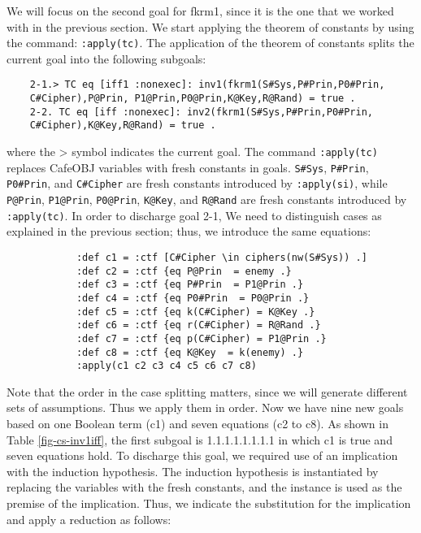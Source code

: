 \documentclass[a4paper,fleqn]{cas-dc}
\begin{document}
We will focus on the second goal for fkrm1, since it is the one that we worked with in the previous section. We start applying the theorem of constants by using the command: \verb!:apply(tc)!. The application of the theorem of constants splits the current goal into the following subgoals:
\begin{small}
	\begin{verbatim}
	2-1.> TC eq [iff1 :nonexec]: inv1(fkrm1(S#Sys,P#Prin,P0#Prin,
	C#Cipher),P@Prin, P1@Prin,P0@Prin,K@Key,R@Rand) = true .
	2-2. TC eq [iff :nonexec]: inv2(fkrm1(S#Sys,P#Prin,P0#Prin,
	C#Cipher),K@Key,R@Rand) = true .
	\end{verbatim}
\end{small}
where the > symbol indicates the current goal.
The command \verb!:apply(tc)! replaces CafeOBJ variables with fresh constants in goals. \verb!S#Sys!, \verb!P#Prin!, \verb!P0#Prin!, and \verb!C#Cipher! are fresh constants introduced by \verb!:apply(si)!, while \verb!P@Prin!, \verb!P1@Prin!, \verb!P0@Prin!, \verb!K@Key!, and \verb!R@Rand! are fresh constants introduced by \verb!:apply(tc)!.
In order to discharge goal 2-1, We need to distinguish cases as explained in the previous section; thus, we introduce the same
equations:
		\begin{verbatim}
			:def c1 = :ctf [C#Cipher \in ciphers(nw(S#Sys)) .]
			:def c2 = :ctf {eq P@Prin  = enemy .}
			:def c3 = :ctf {eq P#Prin  = P1@Prin .}
			:def c4 = :ctf {eq P0#Prin  = P0@Prin .}
			:def c5 = :ctf {eq k(C#Cipher) = K@Key .}
			:def c6 = :ctf {eq r(C#Cipher) = R@Rand .}
			:def c7 = :ctf {eq p(C#Cipher) = P1@Prin .}
			:def c8 = :ctf {eq K@Key  = k(enemy) .}
			:apply(c1 c2 c3 c4 c5 c6 c7 c8)
		\end{verbatim}
	\noindent
Note that the order in the case splitting matters, since we will generate different sets of assumptions. Thus we apply them in order. Now we have nine new goals based on one Boolean term (c1) and seven equations (c2 to c8). As shown in Table \ref{fig-cs-inv1iff}, the first subgoal is 1.1.1.1.1.1.1.1 in which c1 is true and seven equations hold. To discharge this goal, we required use of an implication with the induction hypothesis. The induction hypothesis is instantiated by	replacing the variables with the fresh constants, and the instance is used as the premise of the implication. Thus, we indicate the substitution for the implication and apply a reduction as follows:
\end{document}
